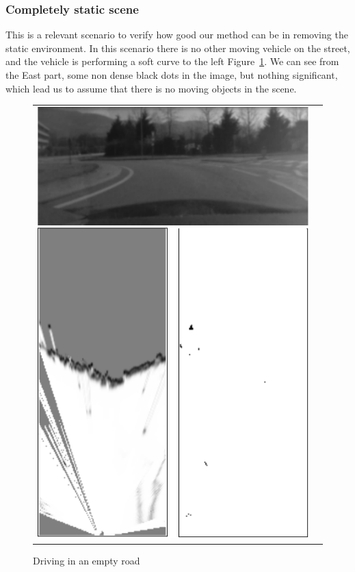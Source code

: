 \subsubsection{Completely static scene}

This is a relevant scenario to verify how good our method can be in removing the static environment. In this scenario there is no other moving vehicle on the street, and the vehicle is performing a soft curve to the left Figure~\ref{fig:result:scenestatic}. We can see from the East part, some non dense black dots in the image, but nothing significant, which lead us to assume that there is no moving objects in the scene.

\begin{figure}[H]
   \centering
     \begin{tabular}{lr}
       \includegraphics[scale=0.60]{img/fig:result:scenestatic}
     \end{tabular}
   \caption{Driving in an empty road}
   \label{fig:result:scenestatic}
\end{figure}